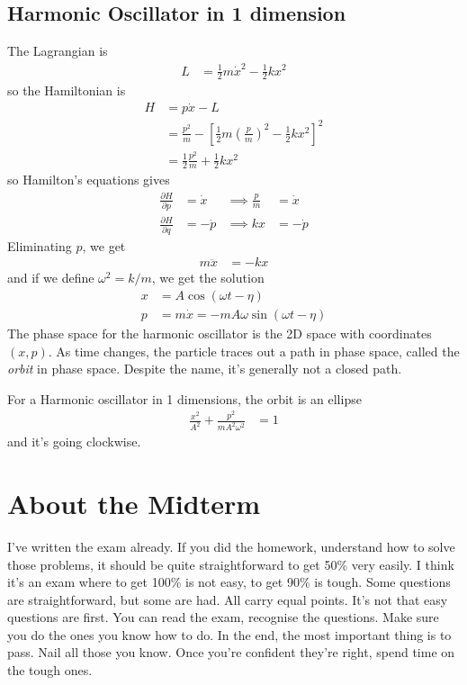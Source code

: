 \subsection{Harmonic Oscillator in 1 dimension}
The Lagrangian is
\begin{align}
    L &= \frac{1}{2}m\dot{x}^2 - \frac{1}{2}kx^2
\end{align}
so the Hamiltonian is
\begin{align}
    H &= p\dot{x} - L\\
    &= \frac{p^2}{m} - \left[ 
    \frac{1}{2}m\left( \frac{p}{m} \right)^2
    - \frac{1}{2}kx^2
    \right]^2\\
    &=
    \frac{1}{2}\frac{p^2}{m}
    + \frac{1}{2}kx^2
\end{align}
so Hamilton's equations gives
\begin{align}
    \frac{\partial H}{\partial p} &= \dot{x}
    &\implies
    \frac{p}{m} &= \dot{x}\\
    \frac{\partial H}{\partial q} &= -\dot{p}
    &\implies
    kx &= -\dot{p}
\end{align}
Eliminating $p$,
we get
\begin{align}
    m\ddot{x} &= -kx
\end{align}
and if we define $\omega^2 = k/m$,
we get the solution
\begin{align}
    x &= A \cos(\omega t - \eta)\\
    p &= m\dot{x} = - mA\omega \sin(\omega t - \eta)
\end{align}
The phase space for the harmonic oscillator is the 2D space with coordinates
$(x,p)$.
As time changes,
the particle traces out a path in phase space,
called the \emph{orbit} in phase space.
Despite the name, it's generally not a closed path.

For a Harmonic oscillator in 1 dimensions,
the orbit is an ellipse
\begin{align}
    \frac{x^2}{A^2} + \frac{p^2}{mA^2\omega^2} &= 1
\end{align}
and it's going clockwise.

\section{About the Midterm}
I've written the exam already.
If you did the homework,
understand how to solve those problems,
it should be quite straightforward to get 50\% very easily.
I think it's an exam where to get 100\% is not easy,
to get 90\% is tough.
Some questions are straightforward,
but some are had.
All carry equal points.
It's not that easy questions are first.
You can read the exam,
recognise the questions.
Make sure you do the ones you know how to do.
In the end,
the most important thing is to pass.
Nail all those you know.
Once you're confident they're right,
spend time on the tough ones.

